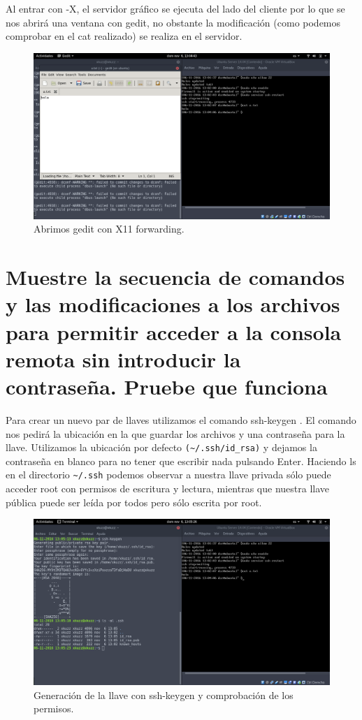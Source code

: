 \begin{flushleft}
Al entrar con -X, el servidor gráfico se ejecuta del lado del cliente por lo que se nos abrirá una ventana con gedit, no obstante la modificación (como podemos comprobar en el cat realizado) se realiza en el servidor.
\begin{figure}[H]
	\centering
	\includegraphics[scale=0.3]{geditX.png}
	\caption{Abrimos gedit con X11 forwarding.}
\end{figure}

\section{Muestre la secuencia de comandos y las modificaciones a los archivos para permitir acceder a la consola remota sin introducir la contraseña. Pruebe que funciona}
Para crear un nuevo par de llaves utilizamos el comando ssh-keygen \cite{c6a}. El comando nos pedirá la ubicación en la que guardar los archivos y una contraseña para la llave. Utilizamos la ubicación por defecto \verb|(~/.ssh/id_rsa)| y dejamos la contraseña en blanco para no tener que escribir nada pulsando Enter. Haciendo ls en el directorio \verb|~/.ssh| podemos observar a nuestra llave privada sólo puede acceder root con permisos de escritura y lectura, mientras que nuestra llave pública puede ser leída por todos pero sólo escrita por root.

\begin{figure}[H]
	\centering
	\includegraphics[scale=0.3]{ssh-keygen.png}
	\caption{Generación de la llave con ssh-keygen y comprobación de los permisos.}
\end{figure}


\end{flushleft}
